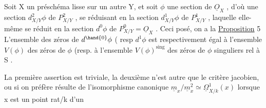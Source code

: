  Soit X un préschéma lisse sur un
autre Y, et soit $\phi$ une section de $\underline{O}_X$ , d'où une section $d^2_{X/Y}\phi$ de
$P^2_{X/Y}$ , se réduisant en la section $d^1_{X/Y}\phi$ de $P^1_{X/Y}$ , laquelle elle-même
se réduit en la section $d^0\phi$  de $P^0_{X/Y} = \underline{O}_X$ . Ceci posé, on a la
\uline{Proposition} 5 L'ensemble des zéros de $d^{\hand{0}}\phi$ ( resp $d^1\phi$ \hand{)} 
 est respectivement égal à l'ensemble $V(\phi)$ des zéros de $\phi$ (resp. à
l'ensemble $V(\phi)^{\mathrm{sing}}$ des zéros de $\phi$ singuliers rel à S\hand{)} 
.

La première assertion est triviale, la deuxième n'est autre
que le critère jacobien, ou si on préfère résulte de l'isomorphisme
canonique $\underline{m}_x/\underline{m}_x^2 \simeq \underline{\Omega}^1_{X/k}(x)$ lorsque x est un point rat/k d'un

